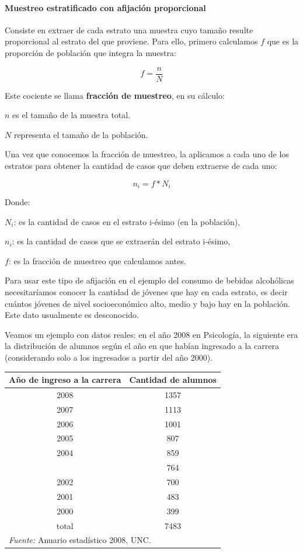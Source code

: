 \documentclass[]{article}
\let\oldparagraph\paragraph
\renewcommand{\paragraph}[1]{\oldparagraph{#1}\mbox{}}
\begin{document}
\hypertarget{muestreo-estratificado-con-afijacion-proporcional}{%
\paragraph{Muestreo estratificado con afijación proporcional}\label{muestreo-estratificado-con-afijacion-proporcional}}

Consiste en extraer de cada estrato una muestra cuyo tamaño resulte
proporcional al estrato del que proviene. Para ello, primero calculamos \(f\)
que es la proporción de población que integra la muestra:

\[f = \frac{n}{N}\]

Este cociente se llama \textbf{fracción de muestreo}, en su cálculo:

\(n\) es el tamaño de la muestra total.

\(N\) representa el tamaño de la población.

Una vez que conocemos la fracción de muestreo, la aplicamos a cada uno
de los estratos para obtener la cantidad de casos que deben extraerse de
cada uno:

\[n_{i} = f*N_{i}\]

Donde:

\(N_{i}\): es la cantidad de casos en el estrato i-ésimo (en la población),

\(n_{i}\): es la cantidad de casos que se extraerán del estrato i-ésimo,

\(f\): es la fracción de muestreo que calculamos antes.

Para usar este tipo de afijación en el ejemplo del consumo de bebidas
alcohólicas necesitaríamos conocer la cantidad de jóvenes que hay en
cada estrato, es decir cuántos jóvenes de nivel socioeconómico alto,
medio y bajo hay en la población. Este dato usualmente es desconocido.

Veamos un ejemplo con datos reales: en el año 2008 en Psicología, la
siguiente era la distribución de alumnos según el año en que habían
ingresado a la carrera (considerando solo a los ingresados a partir del
año 2000).

\begin{table}[H]
\centering
\begin{tabular}{cc}
\toprule
Año de ingreso a la carrera & Cantidad de alumnos\\
\midrule
\rowcolor{gray!6}  2008 & 1357\\
2007 & 1113\\
\rowcolor{gray!6}  2006 & 1001\\
2005 & 807\\
\rowcolor{gray!6}  2004 & 859\\
\addlinespace
2003 & 764\\
\rowcolor{gray!6}  2002 & 700\\
2001 & 483\\
\rowcolor{gray!6}  2000 & 399\\
total & 7483\\
\bottomrule
\multicolumn{2}{l}{\textit{Fuente: } Anuario estadístico 2008, UNC.}\\
\end{tabular}
\end{table}
\end{document}

